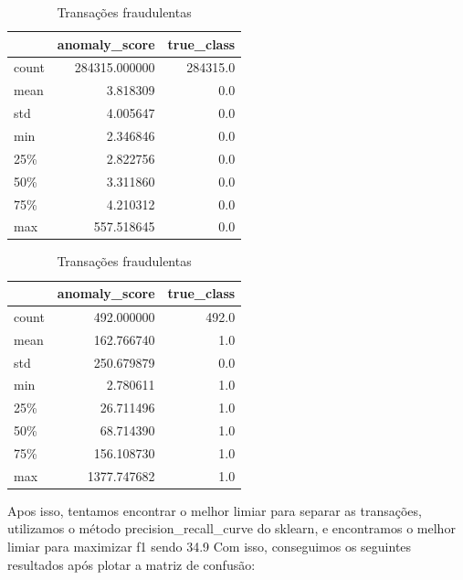 \documentclass[a4paper,12pt]{article}
\begin{document}
\begin{table}[H]
    \centering
  \begin{minipage}{0.48\textwidth}
      \centering
      \begin{tabular}{lrr}
          \toprule
          & \textbf{anomaly\_score} & \textbf{true\_class} \\
          \midrule
          count & 284315.000000 & 284315.0 \\
          mean & 3.818309 & 0.0 \\
          std & 4.005647 & 0.0 \\
          min & 2.346846 & 0.0 \\
          25\% & 2.822756 & 0.0 \\
          50\% & 3.311860 & 0.0 \\
          75\% & 4.210312 & 0.0 \\
          max & 557.518645 & 0.0 \\
          \bottomrule
      \end{tabular}
      \caption{Transações normais}
      \label{tab:score_anomalia_normal}
  \end{minipage}\hfill
  \begin{minipage}{0.48\textwidth}
      \centering
      \begin{tabular}{lrr}
          \toprule
          & \textbf{anomaly\_score} & \textbf{true\_class} \\
          \midrule
          count & 492.000000 & 492.0 \\
          mean & 162.766740 & 1.0 \\
          std & 250.679879 & 0.0 \\
          min & 2.780611 & 1.0 \\
          25\% & 26.711496 & 1.0 \\
          50\% & 68.714390 & 1.0 \\
          75\% & 156.108730 & 1.0 \\
          max & 1377.747682 & 1.0 \\
          \bottomrule
      \end{tabular}
      \caption{Transações fraudulentas}
      \label{tab:score_anomalia_fraude}
  \end{minipage}
\end{table}
Apos isso, tentamos encontrar o melhor limiar para separar as transações, utilizamos o método precision\_recall\_curve do sklearn, e encontramos o melhor limiar para maximizar f1 sendo 34.9 Com isso, conseguimos os seguintes resultados após plotar a matriz de confusão:
\end{document}
